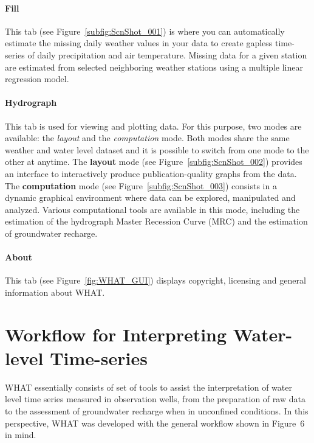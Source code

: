 \documentclass[WHATMANUAL.tex]{subfiles}
\begin{document}
\paragraph{Fill} This tab (see Figure~\ref{subfig:ScnShot_001}) is where you can automatically estimate the missing daily weather values in your data to create gapless time-series of daily precipitation and air temperature. Missing data for a given station are estimated from selected neighboring weather stations using a multiple linear regression model.

\paragraph{Hydrograph} This tab is used for viewing and plotting data. For this purpose, two modes are available: the \emph{layout} and the \emph{computation} mode. Both modes share the same weather and water level dataset and it is possible to switch from one mode to the other at anytime. The \textbf{layout} mode (see Figure~\ref{subfig:ScnShot_002}) provides an interface to interactively produce publication-quality graphs from the data. The \textbf{computation} mode (see Figure~\ref{subfig:ScnShot_003}) consists in a dynamic graphical environment where data can be explored, manipulated and analyzed. Various computational tools are available in this mode, including the estimation of the hydrograph Master Recession Curve (MRC) and the estimation of groundwater recharge.

\paragraph{About} This tab (see Figure~\ref{fig:WHAT_GUI}) displays copyright, licensing and general information about WHAT.

\section{Workflow for Interpreting Water-level Time-series}
\label{sec:workflow}

WHAT essentially consists of set of tools to assist the interpretation of water level time series measured in observation wells, from the preparation of raw data to the assessment of groundwater recharge when in unconfined conditions. In this perspective, WHAT was developed with the general workflow shown in Figure 6  in mind.
\end{document}
